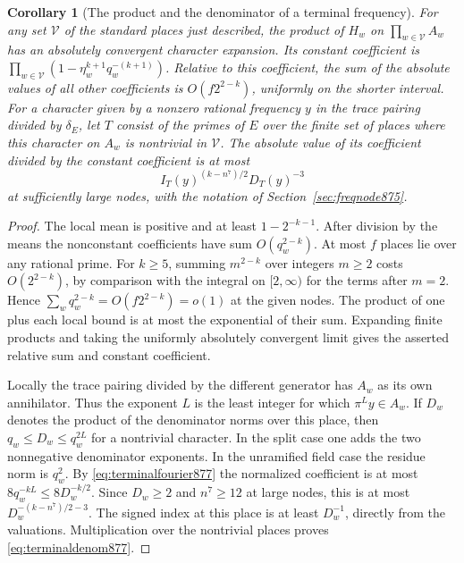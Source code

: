 \documentclass[a4paper,11pt]{article}
\newtheorem{corollary}[proposition]{Corollary}
\theoremstyle{definition}
\theoremstyle{remark}
\numberwithin{equation}{section}
\begin{document}
\begin{corollary}[The product and the denominator of a terminal frequency]
\leavevmode\label{cor:terminalproduct877}
For any set \(\mathcal V\) of the standard places just described,
the product of \(H_w\) on \(\prod_{w\in\mathcal V}A_w\) has an
absolutely convergent character expansion. Its constant coefficient
is \(\prod_{w\in\mathcal V}(1-\eta_w^{k+1}q_w^{-(k+1)})\). Relative
to this coefficient, the sum of the absolute values of all other
coefficients is \(O(f2^{2-k})\), uniformly on the shorter interval.
For a character given by a nonzero rational frequency \(y\) in the
trace pairing divided by \(\delta_E\), let \(T\) consist of the
primes of \(E\) over the finite set of places where this character
on \(A_w\) is nontrivial in \(\mathcal V\). The absolute value of
its coefficient divided by the constant coefficient is at most
\begin{equation}
             I_T(y)^{(k-n^7)/2}D_T(y)^{-3}
 \label{eq:terminaldenom877}
\end{equation}
at sufficiently large nodes, with the notation of
Section~\ref{sec:freqnode875}.
\end{corollary}
\begin{proof}
The local mean is positive and at least \(1-2^{-k-1}\). After
division by the means the nonconstant coefficients have sum
\(O(q_w^{2-k})\). At most \(f\) places lie over any rational
prime. For \(k\ge5\), summing \(m^{2-k}\) over integers \(m\ge2\)
costs \(O(2^{2-k})\), by comparison with the integral on
\([2,\infty)\) for the terms after \(m=2\). Hence
\(\sum_w q_w^{2-k}=O(f2^{2-k})=o(1)\) at the given nodes.
The product of one plus each local bound is at most the
exponential of their sum. Expanding finite products and taking
the uniformly absolutely convergent limit gives the asserted
relative sum and constant coefficient.

Locally the trace pairing divided by the different generator has
\(A_w\) as its own annihilator. Thus the exponent \(L\) is the least
integer for which \(\pi^L y\in A_w\). If \(D_w\) denotes the
product of the denominator norms over this place, then
\(q_w\le D_w\le q_w^{2L}\) for a nontrivial character. In the split
case one adds the two nonnegative denominator exponents. In the
unramified field case the residue norm is \(q_w^2\). By
\eqref{eq:terminalfourier877} the normalized coefficient is at most
\(8q_w^{-kL}\le8D_w^{-k/2}\). Since \(D_w\ge2\) and \(n^7\ge12\)
at large nodes, this is at most \(D_w^{-(k-n^7)/2-3}\).
The signed index at this place is at least \(D_w^{-1}\), directly
from the valuations. Multiplication over the nontrivial places
proves \eqref{eq:terminaldenom877}.
\end{proof}
\end{document}
